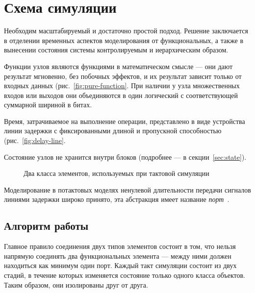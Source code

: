 \section{Схема симуляции}

Необходим масштабируемый и достаточно простой подход. Решение заключается в отделении временных аспектов моделирования от функциональных, а также в вынесении состояния системы контролируемым и иерархическим образом. 

\begin{itemize*}
    \item Функции узлов являются функциями в математическом смысле — они дают результат мгновенно, без побочных эффектов, и их результат зависит только от входных данных (рис.~\ref{fig:pure-function}. При наличии у узла множественных входов или выходов они объединяются в один логический с соответствующей суммарной шириной в битах.
    \item Время, затрачиваемое на выполнение операции, представлено в виде устройства линии задержки с фиксированными длиной и пропускной способностью (рис.~\ref{fig:delay-line}.
    \item Состояние узлов не хранится внутри блоков (подробнее — в секции~\ref{sec:state}).
\end{itemize*}

\begin{figure}[htbp]
\centering
{}
\caption{Два класса элементов, используемых при тактовой симуляции}
\end{figure}

Моделирование в потактовых моделях ненулевой длительности передачи сигналов линиями задержки широко принято, эта абстракция имеет название \textit{порт}~\cite{asim}.

\subsection{Алгоритм работы}

Главное правило соединения двух типов элементов состоит в том, что нельзя напрямую соединять два функциональных элемента — между ними должен находиться как минимум один порт. Каждый такт симуляции состоит из двух стадий, в течение которых изменяется состояние только одного класса объектов. Таким образом, они изолированы друг от друга.

